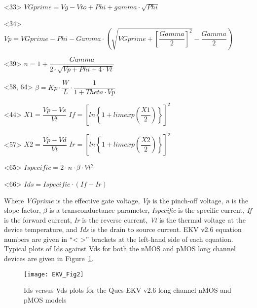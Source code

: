 <33> \hspace{10mm}  $VGprime = Vg-Vto+Phi+gamma \cdot \sqrt{Phi}$

<34> \hspace{10mm}  $Vp=VGprime-Phi-Gamma \cdot \left(\sqrt{VGprime+\left[ \dfrac{Gamma}{2}\right]^{2} } -\dfrac{Gamma}{2} \right) $

<39> \hspace{10mm}  $n=1 + \dfrac{Gamma}{2 \cdot \sqrt{Vp+Phi+4 \cdot Vt}}$

<58, 64> \hspace{7mm} $\beta =Kp \cdot \dfrac{W}{L} \cdot \dfrac{1}{1+Theta \cdot Vp}$

<44>  \hspace{10mm}  $X1=\dfrac{Vp-Vs}{Vt}$  \hspace{5mm}  $If = \left[ ln\left\lbrace 1+limexp\left( \dfrac{X1}{2}\right) \right\rbrace \right]^{2} $

<57>  \hspace{10mm}  $X2=\dfrac{Vp-Vd}{Vt}$  \hspace{5mm}  $Ir = \left[ ln\left\lbrace 1+limexp\left( \dfrac{X2}{2}\right) \right\rbrace \right]^{2} $

<65> \hspace{10mm}   $Ispecific = 2 \cdot n \cdot \beta \cdot Vt^{2}$

<66> \hspace{10mm}   $ Ids = Ispecific \cdot \left( If-Ir \right ) $

\vspace{8mm}

Where \textit{VGprime} is the effective gate voltage, \textit{Vp} is
the pinch-off voltage, \textit{n} is the slope factor, $\beta$ is a
transconductance parameter, \textit{Ispecific} is the specific
current, \textit{If} is the forward current, \textit{Ir} is the
reverse current, \textit{Vt} is the thermal voltage at the device
temperature, and \textit{Ids} is the drain to source current.  EKV
v2.6 equation numbers are given in ``< >'' brackets at the left-hand
side of each equation.  Typical plots of Ids against Vds for both the
nMOS and pMOS long channel devices are given in Figure~\ref{fig:EKV2}.


\begin{figure}
  \centering
  \texttt{[image: EKV\_Fig2]}
  \caption{Ids versus Vds plots for the Qucs EKV v2.6 long channel nMOS and pMOS models}
  \label{fig:EKV2}
\end{figure} 



